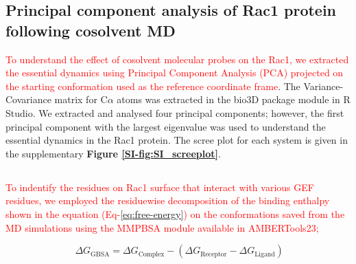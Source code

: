 \documentclass[12pt,a4paper]{achemso}
\begin{document}
\subsection{Principal component analysis of Rac1 protein following cosolvent MD}
\textcolor{red}{To understand the effect of \textcolor{red}{cosolvent molecular probes} on the Rac1, we extracted the essential dynamics using Principal Component Analysis (PCA) projected on the starting conformation used as the reference coordinate frame}. The Variance-Covariance matrix for C$\alpha$ atoms was extracted in the bio3D package\cite{bio3d} module in R Studio. We extracted and analysed four principal components; however, the first principal component with the largest eigenvalue was used to understand the essential dynamics in the Rac1 protein. The scree plot for each system is given in the supplementary \textbf{Figure \ref{SI-fig:SI_screeplot}}.

\subsection{\color{red}{Identifying the GEF binding hotspots on Rac1 surface using residue decomposition MMGBSA}} 

\textcolor{red}{To indentify the residues on Rac1 surface that interact with various GEF residues, we employed the residuewise decomposition of the binding enthalpy shown in the equation (Eq-\ref{eq:free-energy}) on the conformations saved from the MD simulations using the MMPBSA module\cite{mmpbsa} available in AMBERTools23;}

\begin{equation} \label{eq:free-energy}
     \   {\Delta}G_{\text{GBSA}} = {\Delta}G_{\text{Complex}} - ( {\Delta}G_{\text{Receptor}} - {\Delta}G_{\text{Ligand}})
\end{equation}
\end{document}
